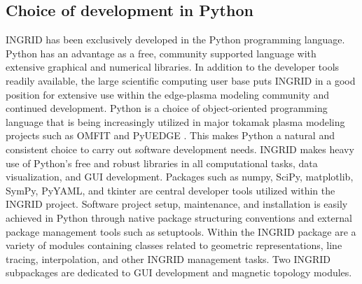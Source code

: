 \subsection{\label{sec:level2}Choice of development in Python}

INGRID has been exclusively developed in the Python programming
language. Python has an advantage as a free, community supported
language with extensive graphical and numerical libraries. In addition
to the developer tools readily available, the large scientific
computing user base puts INGRID in a good position for extensive use
within the edge-plasma modeling community and continued
development. Python is a choice of object-oriented programming
language that is being increasingly utilized in major tokamak plasma
modeling projects such as OMFIT \cite{Meneghini_2015,
  Orso_MENEGHINI2013} and PyUEDGE \cite{PyUEDGE}. This makes Python a
natural and consistent choice to carry out software development
needs. INGRID makes heavy use of Python's free and robust libraries in
all computational tasks, data visualization, and GUI
development. Packages such as numpy, SciPy, matplotlib, SymPy, PyYAML,
and tkinter are central developer tools utilized within the INGRID
project\cite{numpy_5725236, virtanen2019scipy,
  matplotlib_4160265}. Software project setup, maintenance, and
installation is easily achieved in Python through native package
structuring conventions and external package management tools such as
setuptools.  Within the INGRID package are a variety of modules
containing classes related to geometric representations, line tracing,
interpolation, and other INGRID management tasks. Two INGRID
subpackages are dedicated to GUI development and magnetic topology
modules.
